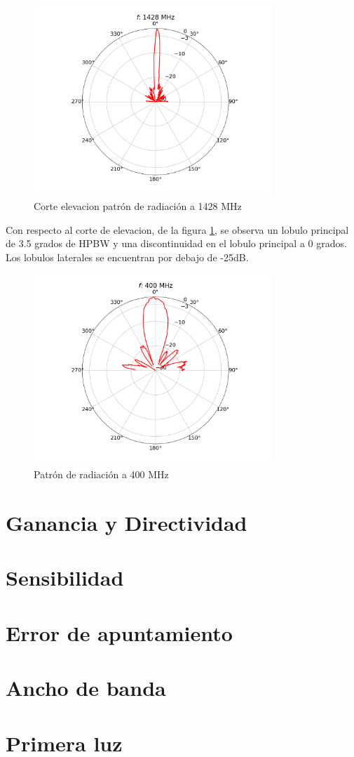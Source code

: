 \begin{figure}
    \centering
    \includegraphics[width=0.8\textwidth]{img/1420rpel}
    \caption{Corte elevacion patrón de radiación a 1428 MHz}
    \label{fig:1420rpel}
\end{figure}

Con respecto al corte de elevacion, de la figura \ref{fig:1420rpel}, se observa un lobulo principal de 3.5 grados de HPBW y una discontinuidad en el lobulo principal a 0 grados. Los lobulos laterales  se encuentran por debajo de -25dB.\\

\begin{figure}
    \centering
    \includegraphics[width=0.8\textwidth]{img/400rp}
    \caption{Patrón de radiación a 400 MHz}
    \label{fig:400rp}
\end{figure}

\section{Ganancia y Directividad}



\section{Sensibilidad}

\section{Error de apuntamiento}

\section{Ancho de banda}

\section{Primera luz}